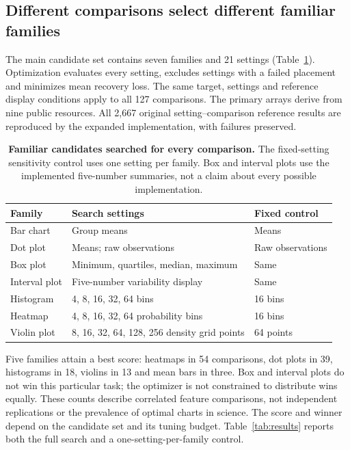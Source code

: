 \documentclass[11pt]{article}
\begin{document}
\subsection*{Different comparisons select different familiar families}
The main candidate set contains seven families and 21 settings (Table~\ref{tab:settings}). Optimization evaluates every setting, excludes settings with a failed placement and minimizes mean recovery loss. The same target, settings and reference display conditions apply to all 127 comparisons. The primary arrays derive from nine public resources.\cite{wdbc,heart,failure,kidney,liver,retina,har,bidmc,wrist} All 2,667 original setting--comparison reference results are reproduced by the expanded implementation, with failures preserved.

\begin{table}[ht]\centering\small
\caption{\textbf{Familiar candidates searched for every comparison.} The fixed-setting sensitivity control uses one setting per family. Box and interval plots use the implemented five-number summaries, not a claim about every possible implementation.}\label{tab:settings}
\begin{tabular}{p{2.5cm}p{7cm}p{3.7cm}}\toprule
Family & Search settings & Fixed control\\\midrule
Bar chart & Group means & Means\\
Dot plot & Means; raw observations & Raw observations\\
Box plot & Minimum, quartiles, median, maximum & Same\\
Interval plot & Five-number variability display & Same\\
Histogram & 4, 8, 16, 32, 64 bins & 16 bins\\
Heatmap & 4, 8, 16, 32, 64 probability bins & 16 bins\\
Violin plot & 8, 16, 32, 64, 128, 256 density grid points & 64 points\\\bottomrule
\end{tabular}\end{table}

Five families attain a best score: heatmaps in 54 comparisons, dot plots in 39, histograms in 18, violins in 13 and mean bars in three. Box and interval plots do not win this particular task; the optimizer is not constrained to distribute wins equally. These counts describe correlated feature comparisons, not independent replications or the prevalence of optimal charts in science. The score and winner depend on the candidate set and its tuning budget. Table~\ref{tab:results} reports both the full search and a one-setting-per-family control.
\end{document}
